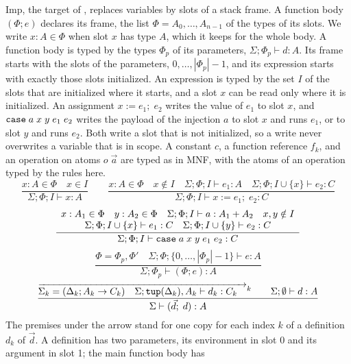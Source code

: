 Imp, the target of , replaces variables by slots of
a stack frame. A function body $(\Phi; e)$ declares its frame, the list
$\Phi = A_0, \ldots, A_{n-1}$ of the types of its slots. We write
$x : A \in \Phi$ when slot $x$ has type $A$, which it keeps for the whole
body. A function body is
typed by the types $\Phi_p$ of its parameters, $\Sigma; \Phi_p \vdash d : A$.
Its frame starts with the slots of the parameters, $0, \ldots, |\Phi_p| - 1$,
and its expression starts with exactly those slots initialized. An expression
is typed by the set $I$ of the slots that are initialized where it starts, and
a slot $x$ can be read only where it is initialized. An assignment
$x \mathrel{:=} e_1;\; e_2$ writes the value of $e_1$ to slot $x$, and
$\mathtt{case}\;a\;x\;y\;e_1\;e_2$ writes the payload of the injection $a$
to slot $x$ and runs $e_1$, or to slot $y$ and runs $e_2$. Both write a
slot that is not initialized, so a write never overwrites a variable
that is in scope. A constant $c$, a function reference $f_k$, and an
operation on atoms $o\;\vec{a}$ are typed as in MNF, with the atoms of an
operation typed by the rules here.
{\small\figdefs
{}
\[
  \dfrac{x : A \in \Phi \quad x \in I}{\Sigma; \Phi; I \vdash x : A}
  \qquad
  \dfrac{x : A \in \Phi \quad x \notin I \quad \Sigma; \Phi; I \vdash e_1 : A \quad
         \Sigma; \Phi; I \cup \{x\} \vdash e_2 : C}
        {\Sigma; \Phi; I \vdash x \mathrel{:=} e_1;\; e_2 : C}
\]
\[
  \dfrac{\begin{array}{c}
           x : A_1 \in \Phi \quad y : A_2 \in \Phi \quad
           \Sigma; \Phi; I \vdash a : A_1 + A_2 \quad x, y \notin I\\
           \Sigma; \Phi; I \cup \{x\} \vdash e_1 : C \quad
           \Sigma; \Phi; I \cup \{y\} \vdash e_2 : C
         \end{array}}
        {\Sigma; \Phi; I \vdash \mathtt{case}\;a\;x\;y\;e_1\;e_2 : C}
\]
\[
  \dfrac{\Phi = \Phi_p, \Phi' \quad
         \Sigma; \Phi; \{0, \ldots, |\Phi_p| - 1\} \vdash e : A}
        {\Sigma; \Phi_p \vdash (\Phi; e) : A}
\]
\[
  \dfrac{\overrightarrow{\Sigma_k = (\Delta_k; A_k \rightarrow C_k) \quad
           \Sigma; \mathtt{tup}(\Delta_k), A_k \vdash d_k : C_k \quad}^{k}
         \qquad \Sigma; \emptyset \vdash d : A}
        {\Sigma \vdash (\vec{d};\; d) : A}
\]
}
The premises under the arrow stand for one copy for each index $k$ of a
definition $d_k$ of $\vec{d}$. A definition has two parameters, its
environment in slot 0 and its argument in slot 1; the main function body has
